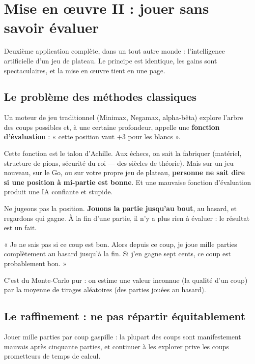 \chapter{Mise en œuvre II : jouer sans savoir évaluer}

Deuxième application complète, dans un tout autre monde : l'intelligence
artificielle d'un jeu de plateau. Le principe est identique, les gains sont
spectaculaires, et la mise en œuvre tient en une page.

\section{Le problème des méthodes classiques}

Un moteur de jeu traditionnel (Minimax, Negamax, alpha-bêta) explore l'arbre
des coups possibles et, à une certaine profondeur, appelle une \textbf{fonction
d'évaluation} : « cette position vaut $+3$ pour les blancs ».

Cette fonction est le talon d'Achille. Aux échecs, on sait la fabriquer
(matériel, structure de pions, sécurité du roi — des siècles de théorie). Mais
sur un jeu nouveau, sur le Go, ou sur votre propre jeu de plateau,
\textbf{personne ne sait dire si une position à mi-partie est bonne}. Et une
mauvaise fonction d'évaluation produit une IA confiante et stupide.

\begin{nkretenir}
Ne jugeons pas la position. \textbf{Jouons la partie jusqu'au bout}, au hasard,
et regardons qui gagne. À la fin d'une partie, il n'y a plus rien à évaluer :
le résultat est un fait.

« Je ne sais pas si ce coup est bon. Alors depuis ce coup, je joue mille
parties complètement au hasard jusqu'à la fin. Si j'en gagne sept cents, ce
coup est probablement bon. »
\end{nkretenir}

C'est du Monte-Carlo pur : on estime une valeur inconnue (la qualité d'un coup)
par la moyenne de tirages aléatoires (des parties jouées au hasard).

\section{Le raffinement : ne pas répartir équitablement}

Jouer mille parties par coup gaspille : la plupart des coups sont manifestement
mauvais après cinquante parties, et continuer à les explorer prive les coups
prometteurs de temps de calcul.

